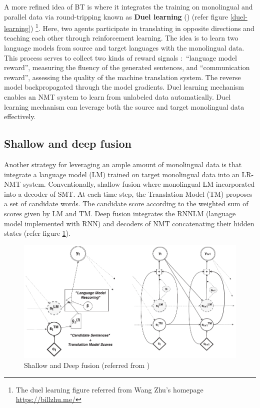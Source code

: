 \documentclass[manuscript,screen]{acmart}
\begin{document}
A more refined idea of BT is where it integrates the training on monolingual and parallel data via round-tripping known as \textbf{Duel learning} (\citet{he2016dual}) (refer figure \ref{duel-learning}) \footnote{The duel learning figure referred from Wang Zhu's homepage \url{https://billzhu.me/}}. Here, two agents participate in translating in opposite directions and teaching each other through reinforcement learning. The idea is to learn two language models from source and target languages with the monolingual data. This process serves to collect two kinds of reward signals $\colon$ ``language model reward'', measuring the fluency of the generated sentences, and ``communication reward'', assessing the quality of the machine translation system. The reverse model backpropagated through the model gradients. Duel learning mechanism enables an NMT system to learn from unlabeled data automatically. Duel learning mechanism can leverage both the source and target monolingual data effectively. 

\subsection{Shallow and deep fusion}
Another strategy for leveraging an ample amount of monolingual data is that integrate a language model (LM) trained on target monolingual data into an LR-NMT system. Conventionally, shallow fusion where monolingual LM incorporated into a decoder of SMT. At each time step, the Translation Model (TM) proposes a set of candidate words. The candidate score according to the weighted sum of scores given by LM and TM. Deep fusion integrates the RNNLM (language model implemented with RNN) and decoders of NMT concatenating their hidden states (refer figure \ref{shallow-deep-fusion}).

\begin{figure}[!h]
  \centering
  \includegraphics[width=0.8\linewidth]{shallowDeepFusionGulcehre.png}
  \caption{Shallow and Deep fusion (referred from \citet{gulcehre2017integrating})}
  \label{shallow-deep-fusion}
\end{figure}
\end{document}
